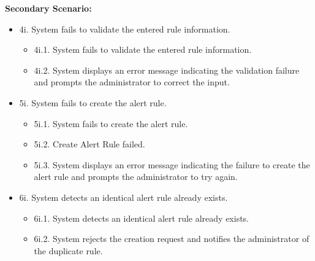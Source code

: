 {\begin{enumerate}[{\bf BE1.}]
	{\bf Secondary Scenario:}
		\begin{itemize}
			\item[] {4i.} System fails to validate the entered rule information.
			\begin{itemize}
				\item[] {4i.1.} System fails to validate the entered rule information.
				\item[] {4i.2.} System displays an error message indicating the validation failure and prompts the administrator to correct the input.
			\end{itemize}
			\item[] {5i.} System fails to create the alert rule.
			\begin{itemize}
				\item[] {5i.1.} System fails to create the alert rule.
				\item[] {5i.2.} Create Alert Rule failed.
				\item[] {5i.3.} System displays an error message indicating the failure to create the alert rule and prompts the administrator to try again.
			\end{itemize}
			\item[] {6i.} System detects an identical alert rule already exists.
			\begin{itemize}
				\item[] {6i.1.} System detects an identical alert rule already exists.
				\item[] {6i.2.} System rejects the creation request and notifies the administrator of the duplicate rule.
			\end{itemize}
		\end{itemize}


\end{enumerate}}
